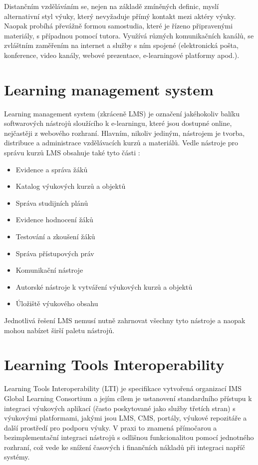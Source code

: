 \documentclass[
print,
  11pt,
  table,   
  nolof,    
  nolot,
  oneside,
  draft
]{fithesis3}
\begin{document}
Distančním vzděláváním se, nejen na základě zmíněných definic, myslí alternativní styl výuky, který nevyžaduje přímý kontakt mezi aktéry výuky. Naopak probíhá převážně formou samostudia, které je řízeno připravenými materiály, s případnou pomocí tutora. Využívá různých komunikačních kanálů, se zvláštním zaměřením na internet a služby s ním spojené (elektronická pošta, konference, video kanály, webové prezentace, e-learningové platformy apod.).


	\section{Learning management system}
Learning management system (zkráceně LMS) je označení jakéhokoliv balíku softwarových nástrojů sloužícího k e-learningu, které jsou dostupné online, nejčastěji z webového rozhraní. Hlavním, nikoliv jediným, nástrojem je tvorba, distribuce a administrace vzdělávacích kurzů a materiálů. Vedle nástroje pro správu kurzů LMS obsahuje také tyto části \cite{lms}:
\begin{itemize}
	\item Evidence a správa žáků
	\item Katalog výukových kurzů a objektů
	\item Správa studijních plánů
	\item Evidence hodnocení žáků
	\item Testování a zkoušení žáků
	\item Správa přístupových práv
	\item Komunikační nástroje
	\item Autorské nástroje k vytváření výukových kurzů a objektů
	\item Úložiště výukového obsahu
\end{itemize}
Jednotlivá řešení LMS nemusí nutně zahrnovat všechny tyto nástroje a naopak mohou nabízet širší paletu nástrojů.

	\section{Learning Tools Interoperability}
Learning Tools Interoperability (LTI) je specifikace vytvořená organizací IMS Global Learning Consortium a jejím cílem je ustanovení standardního přístupu k integraci výukových aplikací (často poskytované jako služby třetích stran) s výukovými platformami, jakými jsou LMS, CMS, portály, výukové repozitáře a další prostředí pro podporu výuky. V praxi to znamená přímočarou a bezimplementační integraci nástrojů s odlišnou funkcionalitou pomocí jednotného rozhraní, což vede ke snížení časových i finančních nákladů při integraci napříč systémy. \cite{imslti}
\end{document}
